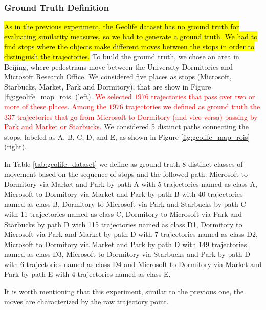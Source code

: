 \documentclass[12pt]{article}
\begin{document}
\subsubsection{Ground Truth Definition}
\hl{As in the previous experiment, the Geolife dataset has no ground truth for evaluating similarity measures, so we had to generate a ground truth. We had to find stops where the objects make different moves between the stops in order to distinguish the trajectories.}
To build the ground truth, we chose an area in Beijing, where pedestrians move between the University Dormitories and Microsoft Research Office. We considered five places as stops (Microsoft, Starbucks, Market, Park and Dormitory), that are show in Figure \ref{fig:geolife_map_rois} (left). \textcolor{Red}{We selected $1976$ trajectories that pass over two or more of these places. Among the $1976$ trajectories we defined as ground truth the $337$ trajectories that go from Microsoft to Dormitory (and vice versa) passing by Park and Market or Starbucks.} We considered 5 distinct paths connecting the stops, labeled as A, B, C, D, and E, as shown in Figure \ref{fig:geolife_map_rois} (right).

In Table \ref{tab:geolife_dataset} we define as ground truth 8 distinct classes of movement based on the sequence of stops and the followed path: Microsoft to Dormitory via Market and Park by path A with 5 trajectories named as class A, Microsoft to Dormitory via Market and Park by path B with 40 trajectories named as class B, Dormitory to Microsoft via Park and Starbucks by path C with 11 trajectories named as class C, Dormitory to Microsoft via Park and Starbucks by path D with 115 trajectories named as class D1, Dormitory to Microsoft via Park and Market by path D with 7 trajectories named as class D2, Microsoft to Dormitory via Market and Park by path D with 149 trajectories named as class D3, Microsoft to Dormitory via Starbucks and Park by path D with 6 trajectories named as class D4 and Microsoft to Dormitory via Market and Park by path E with 4 trajectories named as class E.

It is worth mentioning that this experiment, similar to the previous one, the moves are characterized by the raw trajectory point.
\end{document}
